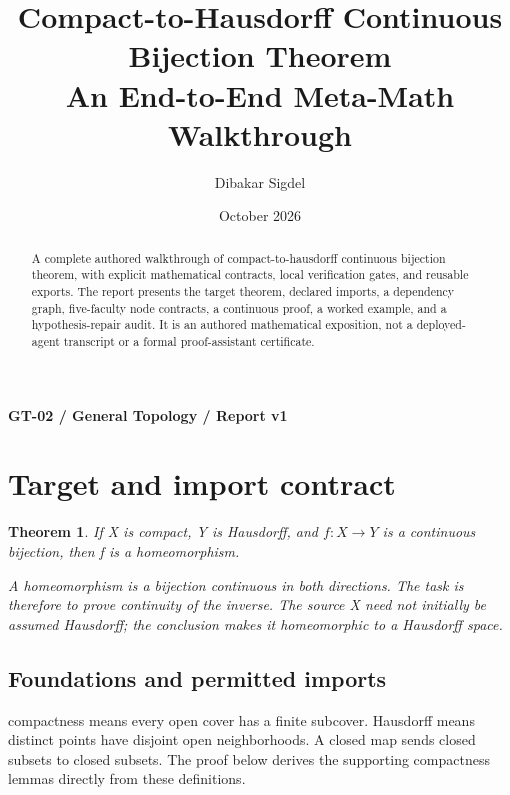 \documentclass[preprint,12pt,aps,pra,showkeys,amsmath,amssymb,superscriptaddress,floatfix]{revtex4-2}
\newtheorem{theorem}{Theorem}[section]
\theoremstyle{definition}
\theoremstyle{remark}
\begin{document}
\title{Compact-to-Hausdorff Continuous Bijection Theorem\\[4pt]\large An End-to-End Meta-Math Walkthrough}

\author{Dibakar Sigdel}


\date{October 2026}

\begin{abstract}

A complete authored walkthrough of compact-to-hausdorff continuous
bijection theorem, with explicit mathematical contracts, local
verification gates, and reusable exports. The report presents the target
theorem, declared imports, a dependency graph, five-faculty node
contracts, a continuous proof, a worked example, and a hypothesis-repair
audit. It is an authored mathematical exposition, not a deployed-agent
transcript or a formal proof-assistant certificate.

\end{abstract}\maketitle\linespread{1.12}\selectfont

\noindent\textbf{GT-02 / General Topology / Report v1}

\section{Target and import contract}

\begin{theorem}

If X is compact, Y is Hausdorff, and \(f:X\to Y\) is a continuous
bijection, then f is a homeomorphism.

A homeomorphism is a bijection continuous in both directions. The task
is therefore to prove continuity of the inverse. The source X need not
initially be assumed Hausdorff; the conclusion makes it homeomorphic to
a Hausdorff space.

\end{theorem}

\subsection{Foundations and permitted imports}

compactness means every open cover has a finite subcover. Hausdorff
means distinct points have disjoint open neighborhoods. A closed map
sends closed subsets to closed subsets. The proof below derives the
supporting compactness lemmas directly from these definitions.
\end{document}
